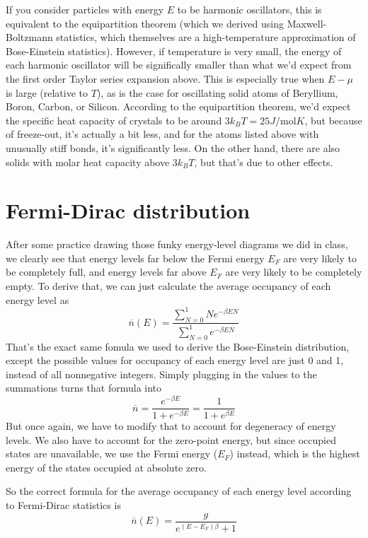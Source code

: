\documentclass[12pt]{article}
\begin{document}
If you consider particles with energy $E$ to be harmonic oscillators, this is equivalent to the equipartition theorem (which we derived using Maxwell-Boltzmann statistics, which themselves are a high-temperature approximation of Bose-Einstein statistics). However, if temperature is very small, the energy of each harmonic oscillator will be significally smaller than what we'd expect from the first order Taylor series expansion above. This is especially true when $E - \mu$ is large (relative to $T$), as is the case for oscillating solid atoms of Beryllium, Boron, Carbon, or Silicon. According to the equipartition theorem, we'd expect the specific heat capacity of crystals to be around $3 k_B T = 25 J / \text{mol} K$, but because of freeze-out, it's actually a bit less, and for the atoms listed above with unusually stiff bonds, it's significantly less. On the other hand, there are also solids with molar heat capacity above $3 k_B T$, but that's due to other effects.

\section{Fermi-Dirac distribution}
After some practice drawing those funky energy-level diagrams we did in class, we clearly see that energy levels far below the Fermi energy $E_F$ are very likely to be completely full, and energy levels far above $E_F$ are very likely to be completely empty. To derive that, we can just calculate the average occupancy of each energy level as
\[\overline{n}(E) = \frac{\sum\limits_{N=0}^1 N e^{- \beta E N}}{\sum\limits_{N=0}^1 e^{- \beta E N}}\]
That's the exact same fomula we used to derive the Bose-Einstein distribution, except the possible values for occupancy of each energy level are just 0 and 1, instead of all nonnegative integers. Simply plugging in the values to the summations turns that formula into
\[\overline{n} = \frac{e^{- \beta E}}{1 + e^{- \beta E}} = \frac{1}{1 + e^{\beta E}} \]
But once again, we have to modify that to account for degeneracy of energy levels. We also have to account for the zero-point energy, but since occupied states are unavailable, we use the Fermi energy ($E_F$) instead, which is the highest energy of the states occupied at absolute zero.

So the correct formula for the average occupancy of each energy level according to Fermi-Dirac statistics is
\[\overline{n}(E) = \frac{g}{e^{(E - E_F) \beta} + 1} \]
\end{document}
